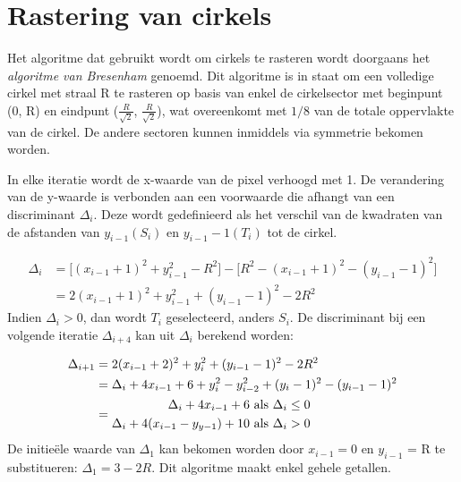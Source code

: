 \documentclass{report}
\begin{document}
	
	\section{Rastering van cirkels}
	Het algoritme dat gebruikt wordt om cirkels te rasteren wordt doorgaans het \textit{algoritme van Bresenham} genoemd. Dit algoritme is in staat om een volledige cirkel met straal R te rasteren op basis van enkel de cirkelsector met beginpunt (0, R) en eindpunt ($\frac{R}{\sqrt{2}}$, $\frac{R}{\sqrt{2}}$), wat overeenkomt met $1/8$ van de totale oppervlakte van de cirkel. De andere sectoren kunnen inmiddels via symmetrie bekomen worden.
	
	
	In elke iteratie wordt de x-waarde van de pixel verhoogd met 1. De verandering van de y-waarde is verbonden aan een voorwaarde die afhangt van een discriminant $\Delta_i$. Deze wordt gedefinieerd als het verschil van de kwadraten van de afstanden van $y_{i-1} (S_i)$ en $y_{i-1} - 1 (T_i)$ tot de cirkel.
	

	\begin{equation*}
	\begin{split}
			\Delta_i & = \bigg[(x_{i - 1} + 1)^2 + y_{i - 1}^2 - R^2\bigg] - \bigg[R^2 -(x_{i - 1} + 1)^2 - (y_{i - 1} - 1)^2\bigg] \\
					   & = 2(x_{i - 1} + 1)^2 + y_{i - 1}^2 + (y_{i - 1} - 1)^2 - 2R^2
	\end{split}
	\end{equation*}
	Indien $\Delta_i > 0$, dan wordt $T_i$ geselecteerd, anders $S_i$. De discriminant bij een volgende iteratie $\Delta_{i + 4}$ kan uit $\Delta_i$ berekend worden:
	
	\begin{equation*}
	\begin{split}
		\Delta_{i + 1} & = 2(x_{i - 1} + 2)^2 + y_{i}^2 + (y_{i - 1} - 1)^2 - 2R^2 \\
					   & = \Delta_i + 4x_{i - 1} + 6 + y_i^2 - y_{i - 2}^2 + (y_i - 1)^2 - (y_{i-1} - 1)^2 \\
					   & = \begin{split}
					   \Delta_i + 4x_{i - 1} + 6              & \hbox{ als } \Delta_i \leq 0 \\
					   \Delta_i + 4(x_{i - 1} - y_{y - 1}) + 10 & \hbox{ als } \Delta_i > 0
					   \end{split}
	\end{split}
	\end{equation*}
	De initieële waarde van $\Delta_1$ kan bekomen worden door $x_{i - 1} = 0$ en $y_{i - 1}$ = R te substitueren:
	$\Delta_1 = 3 - 2R$. Dit algoritme maakt enkel gehele getallen.
	
\end{document}
